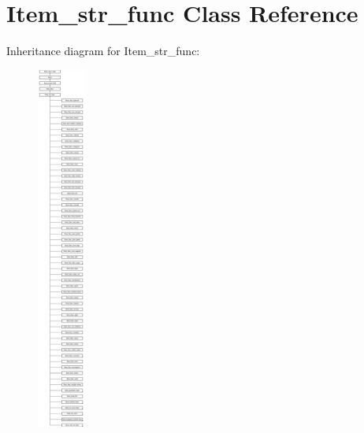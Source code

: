 \hypertarget{classItem__str__func}{}\section{Item\+\_\+str\+\_\+func Class Reference}
\label{classItem__str__func}
Inheritance diagram for Item\+\_\+str\+\_\+func\+:\begin{figure}[H]
\begin{center}
\leavevmode
\includegraphics[height=12.000000cm]{classItem__str__func}
\end{center}
\end{figure}
